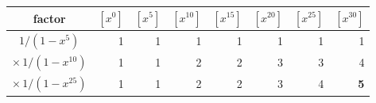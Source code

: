 \begin{tabular}{c|rrrrrrr}
\toprule
factor & $[x^0]$ & $[x^5]$ & $[x^{10}]$ & $[x^{15}]$ & $[x^{20}]$ & $[x^{25}]$ & $[x^{30}]$\\
\midrule
$1/(1-x^5)$            & 1 & 1 & 1 & 1 & 1 & 1 & 1\\
$\times\,1/(1-x^{10})$ & 1 & 1 & 2 & 2 & 3 & 3 & 4\\
$\times\,1/(1-x^{25})$ & 1 & 1 & 2 & 2 & 3 & 4 & \textbf{5}\\
\bottomrule
\end{tabular}
